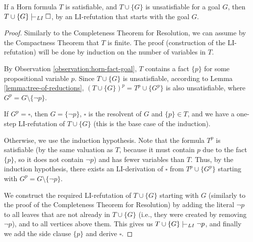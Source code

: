 \begin{theorem}\label{theorem:completeness-of-li-resolution-for-horn}
If a Horn formula $T$ is satisfiable, and $T\cup\{G\}$ is unsatisfiable for a goal $G$, then $T\cup\{G\}\proves_{LI}\square$, by an LI-refutation that starts with the goal $G$.   
\end{theorem}
\begin{proof}
    Similarly to the Completeness Theorem for Resolution, we can assume by the Compactness Theorem that $T$ is finite. The proof (construction of the LI-refutation) will be done by induction on the number of variables in $T$.

    By Observation \ref{observation:horn-fact-goal}, $T$ contains a fact $\{p\}$ for some propositional variable $p$. Since $T\cup\{G\}$ is unsatisfiable, according to Lemma \ref{lemma:tree-of-reductions}, $(T\cup\{G\})^p=T^p\cup\{G^p\}$ is also unsatisfiable, where $G^p=G\setminus\{\neg p\}$.
    
    If $G^p=\square$, then $G=\{\neg p\}$, $\square$ is the resolvent of $G$ and $\{p\}\in T$, and we have a one-step LI-refutation of $T\cup\{G\}$ (this is the base case of the induction). 
    
    Otherwise, we use the induction hypothesis. Note that the formula $T^p$ is satisfiable (by the same valuation as $T$, because it must contain $p$ due to the fact $\{p\}$, so it does not contain $\neg p$) and has fewer variables than $T$. Thus, by the induction hypothesis, there exists an LI-derivation of $\square$ from $T^p\cup\{G^p\}$ starting with $G^p=G\setminus\{\neg p\}$.

    We construct the required LI-refutation of $T\cup\{G\}$ starting with $G$ (similarly to the proof of the Completeness Theorem for Resolution) by adding the literal $\neg p$ to all leaves that are not already in $T\cup\{G\}$ (i.e., they were created by removing $\neg p$), and to all vertices above them. This gives us $T\cup\{G\}\proves_{LI}\neg p$, and finally we add the side clause $\{p\}$ and derive $\square$.
\end{proof}

